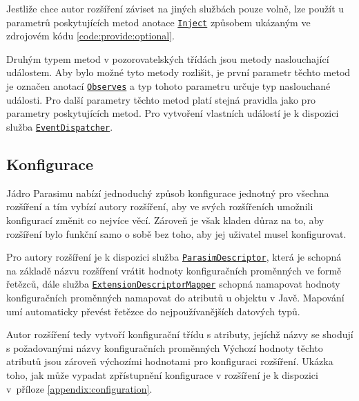 Jestliže chce autor rozšíření záviset na jiných službách pouze volně, lze použít 
u parametrů poskytujících metod anotace \href{https://github.com/sybila/parasim/blob/master/core/src/main/java/org/sybila/parasim/core/annotation/Inject.java}{\texttt{Inject}} způsobem u\-ká\-za\-ným ve zdrojovém
kódu \ref{code:provide:optional}.

Druhým typem metod v pozorovatelských třídách jsou metody na\-slou\-cha\-jí\-cí událostem.
Aby bylo možné tyto metody rozlišit, je první parametr těchto metod je označen anotací \href{https://github.com/sybila/parasim/blob/master/core/src/main/java/org/sybila/parasim/core/annotation/Observes.java}{\texttt{Observes}}
a typ tohoto parametru určuje typ naslouchané události. Pro další parametry těchto metod platí
stejná pravidla jako pro parametry poskytujících metod. Pro vytvoření vlastních událostí
je k dispozici služba \href{https://github.com/sybila/parasim/blob/master/core/src/main/java/org/sybila/parasim/core/api/EventDispatcher.java}{\texttt{EventDispatcher}}.

\subsection{Konfigurace}

Jádro Parasimu nabízí jednoduchý způsob konfigurace jednotný pro všech\-na rozšíření
a tím vybízí autory rozšíření, aby ve svých rozšířeních umožnili konfigurací změnit
co nejvíce věcí. Zároveň je však kladen důraz na to, aby rozšíření bylo funkční 
samo o sobě bez toho, aby jej uživatel musel konfigurovat.

Pro autory rozšíření je k dispozici služba \href{https://github.com/sybila/parasim/blob/master/core/src/main/java/org/sybila/parasim/core/api/configuration/ParasimDescriptor.java}{\texttt{ParasimDescriptor}},
která je schopná na základě názvu rozšíření vrátit hodnoty konfiguračních pro\-měn\-ných
ve formě řetězců, dále služba \href{https://github.com/sybila/parasim/blob/master/core/src/main/java/org/sybila/parasim/core/api/configuration/ExtensionDescriptorMapper.java}{\texttt{ExtensionDescriptorMapper}} schopná namapovat hodnoty konfiguračních pro\-měn\-ných
namapovat do atributů u objektu v Javě. Mapování umí automaticky převést řetězce
do nejpoužívanějších datových typů.

Autor rozšíření tedy vytvoří konfigurační třídu s atributy, jejíchž názvy se shodují
s požadovanými názvy konfiguračních proměnných Výchozí hodnoty těchto atributů jsou
zároveň výchozími hodnotami pro konfiguraci rozšíření. Ukázka toho, jak může vypadat
zpřístupnění konfigurace v rozšíření je k dispozici v~příloze \ref{appendix:configuration}.

